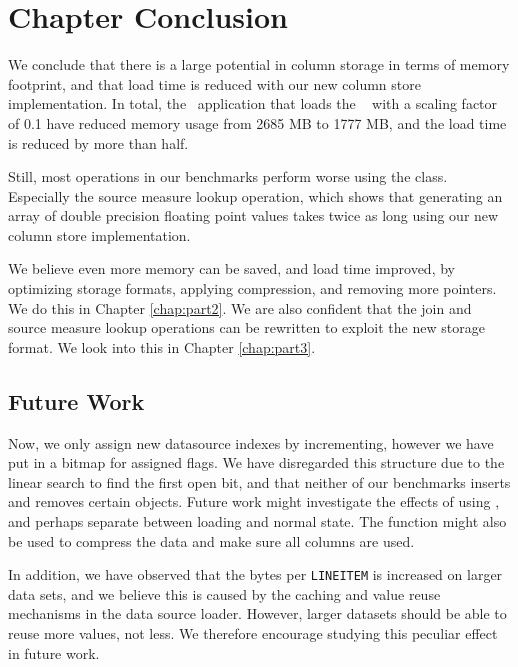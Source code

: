 \section{Chapter Conclusion}
\label{sec:Chapter Conclusion}
We conclude that there is a large potential in column storage in terms of memory footprint, and that load time is reduced with our new column store implementation. In total, the \gd~application that loads the \tpch~ with a scaling factor of 0.1 have reduced memory usage from 2685 MB to 1777 MB, and the load time is reduced by more than half.

Still, most operations in our benchmarks perform worse using the  class. Especially the source measure lookup operation, which shows that generating an array of double precision floating point values takes twice as long using our new column store implementation.

We believe even more memory can be saved, and load time improved, by optimizing storage formats, applying compression, and removing more pointers. We do this in Chapter \ref{chap:part2}. We are also confident that the join and source measure lookup operations can be rewritten to exploit the new storage format. We look into this in Chapter \ref{chap:part3}.

\subsection{Future Work}
\label{sub:Future Work}
Now, we only assign new datasource indexes by incrementing, however we have put in a bitmap for assigned flags. We have disregarded this structure due to the linear search to find the first open bit, and that neither of our benchmarks inserts and removes certain objects. Future work might investigate the effects of using , and perhaps separate between loading and normal state. The  function might also be used to compress the data and make sure all columns are used.

In addition, we have observed that the bytes per \texttt{LINEITEM} is increased on larger data sets, and we believe this is caused by the caching and value reuse mechanisms in the data source loader. However, larger datasets should be able to reuse more values, not less. We therefore encourage studying this peculiar effect in future work.

